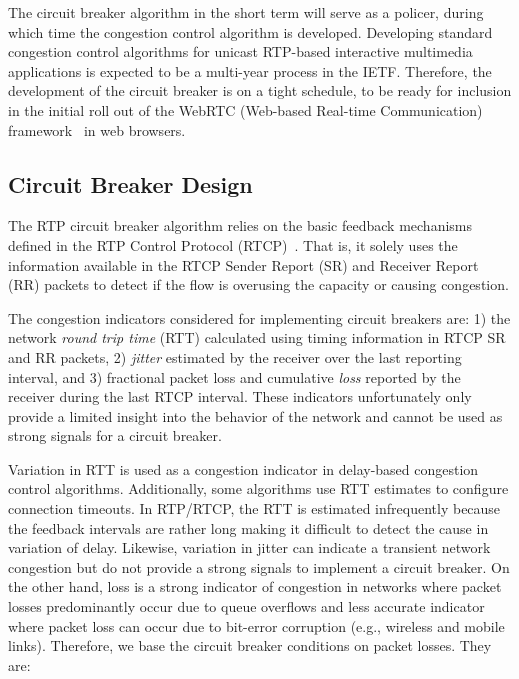 The circuit breaker algorithm in the short term will serve as a policer,
during which time the congestion control algorithm is developed. Developing
standard congestion control algorithms for unicast RTP-based interactive
multimedia applications is expected to be a multi-year process in the IETF.
Therefore, the development of the circuit breaker is on a tight schedule, to
be ready for inclusion in the initial roll out of the WebRTC (Web-based 
Real-time Communication) framework~\cite{jennings:2013:webrtc} in web browsers.

\subsection{Circuit Breaker Design}
\label{fw.cb.design}

The RTP circuit breaker algorithm relies on the basic feedback mechanisms
defined in the RTP Control Protocol (RTCP)~\cite{rfc3550}. That is, it solely
uses the information available in the RTCP Sender Report (SR) and Receiver
Report (RR) packets to detect if the flow is overusing the capacity or causing
congestion.

The congestion indicators considered for implementing circuit breakers are: 1)
the network \emph{round trip time} (RTT) calculated  using timing information
in RTCP SR and RR packets, 2) \emph{jitter} estimated by the receiver over the
last reporting interval, and 3) fractional packet loss and cumulative
\emph{loss} reported by the receiver during the last RTCP interval. These
indicators  unfortunately only provide a limited insight into the behavior of
the network and cannot be used as strong signals for a circuit breaker.

Variation in RTT is used as a congestion indicator in delay-based congestion
control algorithms. Additionally, some algorithms use RTT estimates to
configure connection timeouts. In RTP/RTCP, the RTT is estimated infrequently
because the feedback intervals are rather long making it difficult to detect
the cause in variation of delay. Likewise, variation in jitter can indicate a
transient network congestion but do not provide a strong signals to implement
a circuit breaker. On the other hand, loss is a strong indicator of congestion
in networks where packet losses predominantly occur due to queue overflows and
less accurate indicator where packet loss can occur due to bit-error
corruption (e.g., wireless and mobile links). Therefore, we base the circuit
breaker conditions on packet losses. They are:


